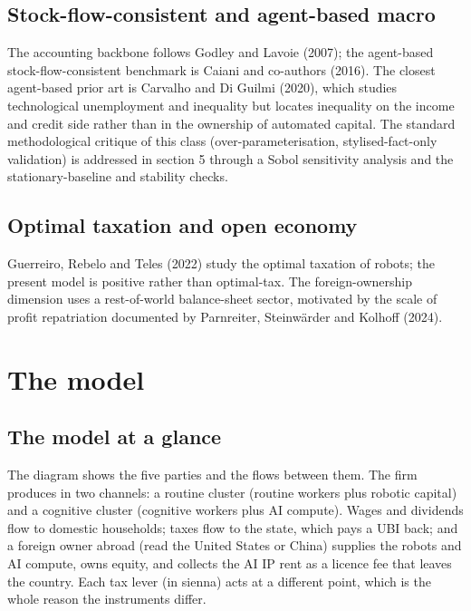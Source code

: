 \documentclass[11pt]{article}
\begin{document}
\hypertarget{stock-flow-consistent-and-agent-based-macro}{%
\subsection{Stock-flow-consistent and agent-based
macro}\label{stock-flow-consistent-and-agent-based-macro}}

The accounting backbone follows Godley and Lavoie (2007); the
agent-based stock-flow-consistent benchmark is Caiani and co-authors
(2016). The closest agent-based prior art is Carvalho and Di Guilmi
(2020), which studies technological unemployment and inequality but
locates inequality on the income and credit side rather than in the
ownership of automated capital. The standard methodological critique of
this class (over-parameterisation, stylised-fact-only validation) is
addressed in section 5 through a Sobol sensitivity analysis and the
stationary-baseline and stability checks.

\hypertarget{optimal-taxation-and-open-economy}{%
\subsection{Optimal taxation and open
economy}\label{optimal-taxation-and-open-economy}}

Guerreiro, Rebelo and Teles (2022) study the optimal taxation of robots;
the present model is positive rather than optimal-tax. The
foreign-ownership dimension uses a rest-of-world balance-sheet sector,
motivated by the scale of profit repatriation documented by Parnreiter,
Steinwärder and Kolhoff (2024).

\hypertarget{model}{}
\hypertarget{the-model}{%
\section{The model}\label{the-model}}

\hypertarget{the-model-at-a-glance}{%
\subsection{The model at a glance}\label{the-model-at-a-glance}}

The diagram shows the five parties and the flows between them. The firm
produces in two channels: a routine cluster (routine workers plus
robotic capital) and a cognitive cluster (cognitive workers plus AI
compute). Wages and dividends flow to domestic households; taxes flow to
the state, which pays a UBI back; and a foreign owner abroad (read the
United States or China) supplies the robots and AI compute, owns equity,
and collects the AI IP rent as a licence fee that leaves the country.
Each tax lever (in sienna) acts at a different point, which is the whole
reason the instruments differ.
\end{document}
